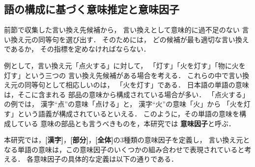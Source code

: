 \subsection{語の構成に基づく意味推定と意味因子}
\label{seusec:meaning factor}

前節で収集した言い換え先候補から，
言い換えとして意味的に過不足のない
言い換え元の同等句を選び出す．
そのためには，
どの候補が最も適切な言い換えであるか，
その指標を定めなければならない．
  
例として，言い換え元「点火する」に対して，
「灯す」「火を灯す」「物に火を灯す」という三つの
言い換え先候補がある場合を考える．
これらの中で言い換え元の同等句として相応しいのは，
「火を灯す」である．
日本語の単語の意味は，そこに含まれる
部品の意味から構成されている場合が多い．
「点火する」の例では，
漢字``点''の意味「点ける」と，
漢字``火''の意味「火」から
「火を灯す」という語義が構成されているといえる．
このように，その単語の意味を構成している
意味の部品とも言うべきものを，本研究では
  {\bf 意味因子}と呼ぶ．
  
本研究では，{\bf [漢字]}，{\bf [部分]}，{\bf [全体]}の3種類の意味因子を定義し，
言い換え元となる単語の意味は，この意味因子のいくつかの組み合わせで表現されていると考える．
各意味因子の具体的な定義は以下の通りである．


